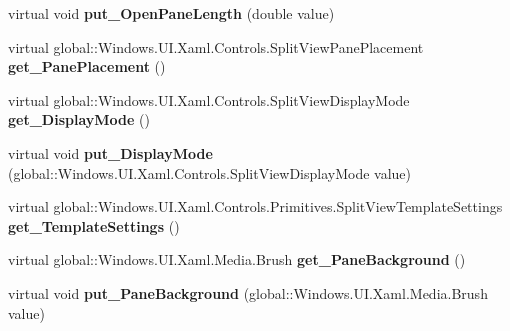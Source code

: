 \begin{DoxyCompactItemize}
virtual void {\bfseries put\+\_\+\+Open\+Pane\+Length} (double value)
\item 
\mbox{\label{class_windows_1_1_u_i_1_1_xaml_1_1_controls_1_1_split_view_ae136f8940aa8871c0d28d1eb593a4a29}} 
virtual global\+::\+Windows.\+U\+I.\+Xaml.\+Controls.\+Split\+View\+Pane\+Placement {\bfseries get\+\_\+\+Pane\+Placement} ()
\item 
\mbox{\label{class_windows_1_1_u_i_1_1_xaml_1_1_controls_1_1_split_view_af29bc8fd9090a72aea2eaf4b3f2c0a30}} 
virtual global\+::\+Windows.\+U\+I.\+Xaml.\+Controls.\+Split\+View\+Display\+Mode {\bfseries get\+\_\+\+Display\+Mode} ()
\item 
\mbox{\label{class_windows_1_1_u_i_1_1_xaml_1_1_controls_1_1_split_view_a1b48b7569672c2b406106e1b2c94556b}} 
virtual void {\bfseries put\+\_\+\+Display\+Mode} (global\+::\+Windows.\+U\+I.\+Xaml.\+Controls.\+Split\+View\+Display\+Mode value)
\item 
\mbox{\label{class_windows_1_1_u_i_1_1_xaml_1_1_controls_1_1_split_view_add67530a837afbb62bb137f7cc503647}} 
virtual global\+::\+Windows.\+U\+I.\+Xaml.\+Controls.\+Primitives.\+Split\+View\+Template\+Settings {\bfseries get\+\_\+\+Template\+Settings} ()
\item 
\mbox{\label{class_windows_1_1_u_i_1_1_xaml_1_1_controls_1_1_split_view_a47635cfeb856accea21323a3ca5eb9da}} 
virtual global\+::\+Windows.\+U\+I.\+Xaml.\+Media.\+Brush {\bfseries get\+\_\+\+Pane\+Background} ()
\item 
\mbox{\label{class_windows_1_1_u_i_1_1_xaml_1_1_controls_1_1_split_view_a6096724a8ab2470ff7286a1cb40cb0f3}} 
virtual void {\bfseries put\+\_\+\+Pane\+Background} (global\+::\+Windows.\+U\+I.\+Xaml.\+Media.\+Brush value)
\item 
\mbox{\label{class_windows_1_1_u_i_1_1_xaml_1_1_controls_1_1_split_view_a1f06fc0c80e7b9e8814204845dac854c}} 

\end{DoxyCompactItemize}
